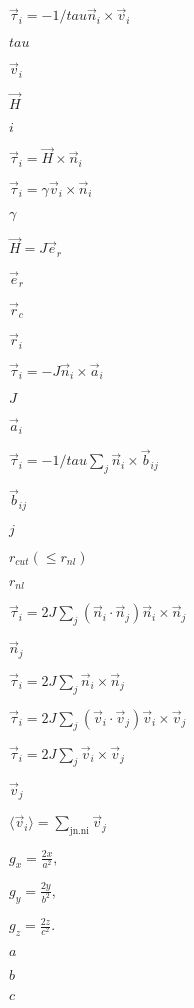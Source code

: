 \documentclass{article}
\begin{document}
$ \vec \tau_i = -1/tau \vec n_i\times\vec v_i $
\pagebreak

$ tau $
\pagebreak

$ \vec v_i $
\pagebreak

$ \vec H $
\pagebreak

$ i $
\pagebreak

$ \vec \tau_i = \vec H \times \vec n_i $
\pagebreak

$ \vec \tau_i = \gamma \vec v_i \times \vec n_i $
\pagebreak

$ \gamma $
\pagebreak

$ \vec H = J\vec e_r $
\pagebreak

$ \vec e_r $
\pagebreak

$ \vec r_c $
\pagebreak

$ \vec r_i $
\pagebreak

$ \vec \tau_i = -J \vec n_i\times\vec a_i $
\pagebreak

$ J $
\pagebreak

$ \vec a_i $
\pagebreak

$ \vec \tau_i = -1/tau \sum_j\vec n_i\times\vec b_{ij} $
\pagebreak

$ \vec b_{ij} $
\pagebreak

$ j $
\pagebreak

$ r_{cut} \left(\leq r_{nl}\right) $
\pagebreak

$ r_{nl} $
\pagebreak

$ \vec \tau_i = 2 J \sum_j \left(\vec n_i\cdot\vec n_j\right)\vec n_i\times\vec n_j $
\pagebreak

$ \vec n_j $
\pagebreak

$ \vec \tau_i = 2 J \sum_j \vec n_i\times\vec n_j $
\pagebreak

$ \vec \tau_i = 2 J \sum_j \left(\vec v_i\cdot\vec v_j\right)\vec v_i\times\vec v_j $
\pagebreak

$ \vec \tau_i = 2 J \sum_j \vec v_i\times\vec v_j $
\pagebreak

$ \vec v_j $
\pagebreak

$ \langle \vec v_i\rangle = \sum_{\mathrm{j n.n i}} \vec v_j $
\pagebreak

$ g_x = \frac{2x}{a^2}, $
\pagebreak

$ g_y = \frac{2y}{b^2}, $
\pagebreak

$ g_z = \frac{2z}{c^2}. $
\pagebreak

$ a $
\pagebreak

$ b $
\pagebreak

$ c $
\pagebreak
\end{document}
